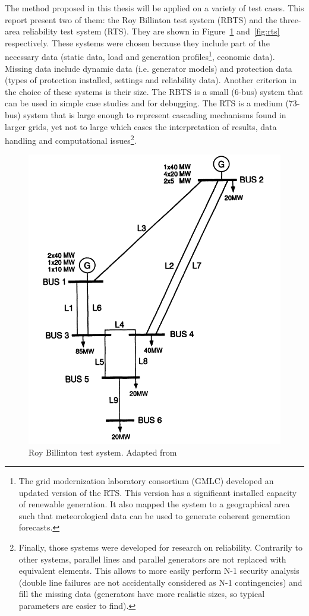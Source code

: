 The method proposed in this thesis will be applied on a variety of test cases. This report present two of them: the Roy Billinton test system (RBTS) and the three-area reliability test system (RTS). They are shown in Figure~\ref{fig:rbts-ch6} and~\ref{fig:rts} respectively. These systems were chosen because they include part of the necessary data (static data, load and generation profiles\footnote{The grid modernization laboratory consortium (GMLC) developed an updated version of the RTS. This version has a significant installed capacity of renewable generation. It also mapped the system to a geographical area such that meteorological data can be used to generate coherent generation forecasts.}, economic data). Missing data include dynamic data (i.e. generator models) and protection data (types of protection installed, settings and reliability data). Another criterion in the choice of these systems is their size. The RBTS is a small (6-bus) system that can be used in simple case studies and for debugging. The RTS is a medium (73-bus) system that is large enough to represent cascading mechanisms found in larger grids, yet not to large which eases the interpretation of results, data handling and computational issues\footnote{Finally, those systems were developed for research on reliability. Contrarily to other systems, parallel lines and parallel generators are not replaced with equivalent elements. This allows to more easily perform N-1 security analysis (double line failures are not accidentally considered as N-1 contingencies) and fill the missing data (generators have more realistic sizes, so typical parameters are easier to find).}.

\begin{figure}
    \centering
    \includegraphics[width=0.6\linewidth]{Figs/RBTS.png}
    \caption{Roy Billinton test system. Adapted from~\cite{rbts}}
    \label{fig:rbts-ch6}
\end{figure}

